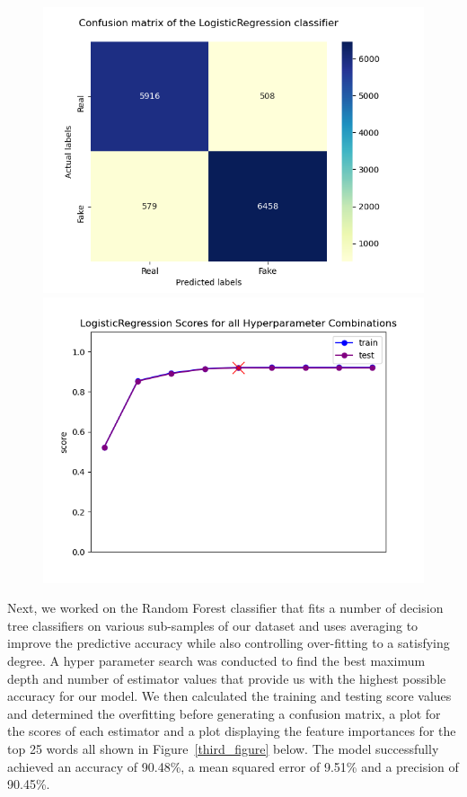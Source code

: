 \documentclass[10pt,twocolumn,letterpaper]{article}
\begin{document}
\begin{figure}[h]
   \begin{center}
        \includegraphics[width=\linewidth]{Latex_Report/report/Graphs/LR/confusion_matrix.png}
        \includegraphics[width=\linewidth]{Latex_Report/report/Graphs/LR/scores_plot.png}
   \end{center}
        \vspace*{-5mm}
        \caption{\label{fifth_figure}}
\end{figure}

Next, we worked on the Random Forest classifier that fits a number of decision tree classifiers on various sub-samples of our dataset and uses averaging to improve the predictive accuracy while also controlling over-fitting to a satisfying degree. A hyper parameter search was conducted to find the best maximum depth and number of estimator values that provide us with the highest possible accuracy for our model. We then calculated the training and testing score values and determined the overfitting before generating a confusion matrix, a plot for the scores of each estimator and a plot displaying the feature importances for the top 25 words all shown in Figure~\ref{third_figure} below. The model successfully achieved an accuracy of 90.48\%, a mean squared error of 9.51\% and a precision of 90.45\%.\\ 
\end{document}
